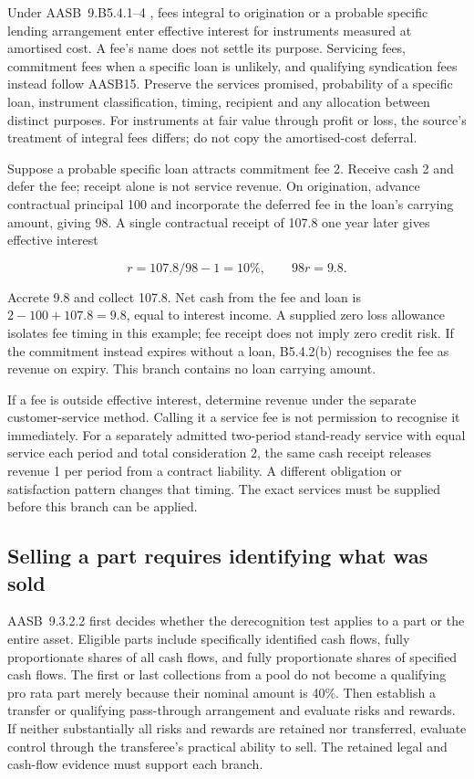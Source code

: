 Under AASB~9.B5.4.1--4 \citep[B5.4.1--4]{aasb9dated}, fees integral to origination or a probable specific lending arrangement enter effective interest for instruments measured at amortised cost. A fee's name does not settle its purpose. Servicing fees, commitment fees when a specific loan is unlikely, and qualifying syndication fees instead follow AASB15. Preserve the services promised, probability of a specific loan, instrument classification, timing, recipient and any allocation between distinct purposes. For instruments at fair value through profit or loss, the source's treatment of integral fees differs; do not copy the amortised-cost deferral.

Suppose a probable specific loan attracts commitment fee 2. Receive cash 2 and defer the fee; receipt alone is not service revenue. On origination, advance contractual principal 100 and incorporate the deferred fee in the loan's carrying amount, giving 98. A single contractual receipt of 107.8 one year later gives effective interest

\[r=107.8/98-1=10\%,\qquad 98r=9.8.\]

Accrete 9.8 and collect 107.8. Net cash from the fee and loan is \(2-100+107.8=9.8\), equal to interest income. A supplied zero loss allowance isolates fee timing in this example; fee receipt does not imply zero credit risk. If the commitment instead expires without a loan, B5.4.2(b) recognises the fee as revenue on expiry. This branch contains no loan carrying amount.

If a fee is outside effective interest, determine revenue under the separate customer-service method. Calling it a service fee is not permission to recognise it immediately. For a separately admitted two-period stand-ready service with equal service each period and total consideration 2, the same cash receipt releases revenue 1 per period from a contract liability. A different obligation or satisfaction pattern changes that timing. The exact services must be supplied before this branch can be applied.

\hypertarget{selling-a-part-requires-identifying-what-was-sold}{%
\subsection{Selling a part requires identifying what was sold}\label{selling-a-part-requires-identifying-what-was-sold}}

AASB~9.3.2.2 \citep[3.2.2--3.2.23]{aasb9dated} first decides whether the derecognition test applies to a part or the entire asset. Eligible parts include specifically identified cash flows, fully proportionate shares of all cash flows, and fully proportionate shares of specified cash flows. The first or last collections from a pool do not become a qualifying pro rata part merely because their nominal amount is 40\%. Then establish a transfer or qualifying pass-through arrangement and evaluate risks and rewards. If neither substantially all risks and rewards are retained nor transferred, evaluate control through the transferee's practical ability to sell. The retained legal and cash-flow evidence must support each branch.


